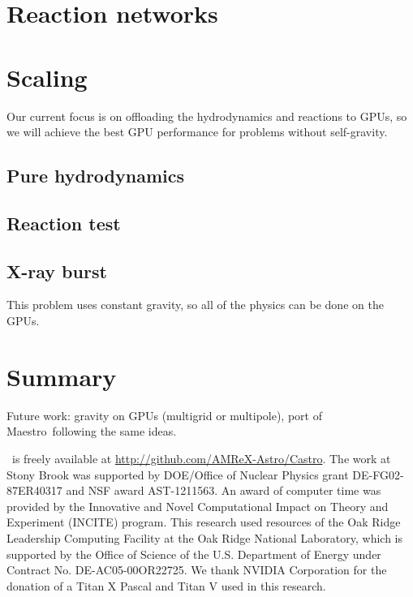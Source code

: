 \documentclass[twocolumn,times]{aastex62}
\newcommand{\castro}{{\sf Castro}}
\newcommand{\maestro}{{\sf Maestro}}
\begin{document}
\section{Reaction networks}

\section{Scaling}

Our current focus is on offloading the hydrodynamics and reactions to
GPUs, so we will achieve the best GPU performance for problems without
self-gravity.

\subsection{Pure hydrodynamics}

\subsection{Reaction test}

\subsection{X-ray burst}

This problem uses constant gravity, so all of the physics can be done on the GPUs.


\section{Summary}

Future work: gravity on GPUs (multigrid or multipole), port of \maestro\ following
the same ideas.



\acknowledgements \castro\ is freely available at
\url{http://github.com/AMReX-Astro/Castro}.  The work at Stony Brook
was supported by DOE/Office of Nuclear Physics grant DE-FG02-87ER40317
and NSF award AST-1211563.  An award of computer time was provided by
the Innovative and Novel Computational Impact on Theory and Experiment
(INCITE) program.  This research used resources of the Oak Ridge
Leadership Computing Facility at the Oak Ridge National Laboratory,
which is supported by the Office of Science of the U.S. Department of
Energy under Contract No. DE-AC05-00OR22725.  We thank NVIDIA Corporation
for the donation of a Titan X Pascal and Titan V used in this research.








\end{document}
